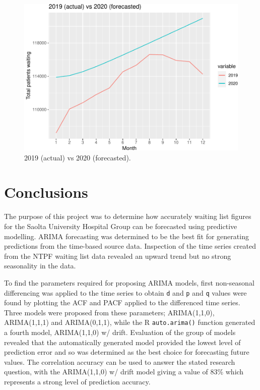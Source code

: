 \documentclass[
  12pt,
]{article}
\begin{document}
\begin{figure}

{\centering \includegraphics[width=0.8\linewidth]{data_science_ca4_files/figure-latex/forecast-2020-comparison-1} 

}

\caption{2019 (actual) vs 2020 (forecasted).}\label{fig:forecast-2020-comparison}
\end{figure}

\newpage

\hypertarget{conclusions}{%
\section{Conclusions}\label{conclusions}}

The purpose of this project was to determine how accurately waiting list figures for the Saolta University Hospital Group can be forecasted using predictive modelling. ARIMA forecasting was determined to be the best fit for generating predictions from the time-based source data. Inspection of the time series created from the NTPF waiting list data revealed an upward trend but no strong seasonality in the data.

To find the parameters required for proposing ARIMA models, first non-seasonal differencing was applied to the time series to obtain \texttt{d} and \texttt{p} and \texttt{q} values were found by plotting the ACF and PACF applied to the differenced time series. Three models were proposed from these parameters; ARIMA(1,1,0), ARIMA(1,1,1) and ARIMA(0,1,1), while the R \texttt{auto.arima()} function generated a fourth model, ARIMA(1,1,0) w/ drift. Evaluation of the group of models revealed that the automatically generated model provided the lowest level of prediction error and so was determined as the best choice for forecasting future values. The correlation accuracy can be used to answer the stated research question, with the ARIMA(1,1,0) w/ drift model giving a value of 83\% which represents a strong level of prediction accuracy.
\end{document}
